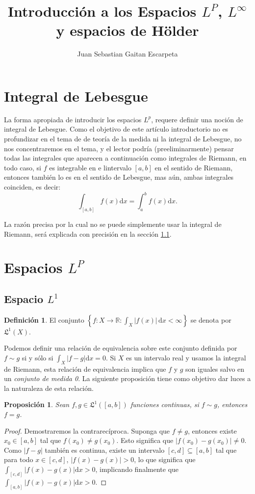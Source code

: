 \documentclass{article}
\author{Juan Sebastian Gaitan Escarpeta}
\title{Introducción a los Espacios $L^P$, $L^\infty$ y espacios de
Hölder}
\newtheorem{prop}[thm]{Proposición}
\theoremstyle{definition}
\newtheorem{defi}[thm]{Definición}
\begin{document}
\maketitle
\section*{Integral de Lebesgue}

La forma apropiada de introducir los espacios $L^p$, requere definir
una noción de integral de Lebesgue. Como el objetivo de este artículo
introductorio no es profundizar en el tema de de teoría de la medida
ni la integral de Lebesgue, no nos concentraremos en el tema, y el
lector podría (preeliminarmente) pensar todas las integrales que
aparecen a continuación como integrales de Riemann, en todo caso, si
$f$ es integrable en e lintervalo $[a,b]$ en el sentido de Riemann,
entonces también lo es en el sentido de Lebesgue, mas aún, ambas
integrales coinciden, es decir:
\[
\int_{[a,b]}^{} f(x) \text{d}x=\int_{a}^{b} f(x) \text{d}x.
\]

La razón precisa por la cual no se puede simplemente usar la integral
de Riemann, será explicada con precisión en la sección
\ref{sub:Espacio L1}.

\section{Espacios $L^P$}
\subsection{Espacio $L^1$}%
\label{sub:Espacio L1}

\begin{defi}
El conjunto $\left\{f  \colon X  \to \mathbb{R} : \int_{X}^{}
|f(x)| \, \text{d}x < \infty \right\}$ se denota por
$\mathfrak{L}^1(X)$.
\end{defi}

Podemos definir una relación de equivalencia sobre este conjunto definida por $f\sim g$ si
y sólo si $\int_{X}^{} |f-g| \text{d}x=0$. Si $X$ es un intervalo real
y usamos la integral de Riemann, esta relación de equivalencia implica
que $f$ y $g$ son iguales salvo en un \textit{conjunto de medida 0}.
La siguiente proposición tiene como objetivo dar luces a la naturaleza
de esta relación.

\begin{prop}
Sean $f,g \in \mathfrak{L}^1([a,b])$ funciones continuas, si $f\sim
g$, entonces $f=g$.
\end{prop}
\begin{proof}
	Demostraremos la contrarecíproca. Suponga que $f\neq g$, entonces
existe $x_0\in [a,b]$ tal que $f(x_0)\neq g(x_0)$. Esto significa que
 $|f(x_0)-g(x_0)|\neq 0$. Como $|f-g|$ también es continua, existe un
intervalo $[c,d]\subseteq [a,b]$ tal que para todo $x\in [c,d]$,
$|f(x)-g(x)|>0$, lo que significa que $\int_{[c,d]} |f(x)-g(x)|
\text{d}x>0$, implicando finalmente que $\int_{[a,b]} |f(x)-g(x)|
\text{d}x >0$.
\end{proof}
\end{document}
